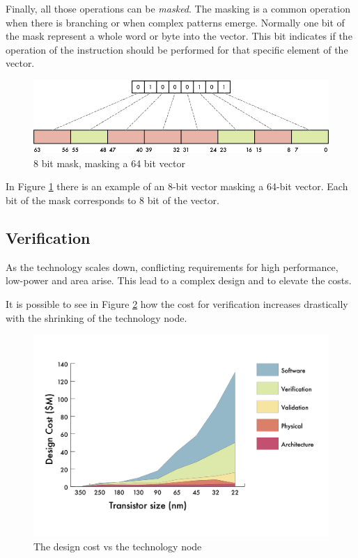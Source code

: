Finally, all those operations can be \textit{masked}. The masking is a common operation when there is branching or when complex patterns emerge.
Normally one bit of the mask represent a whole word or byte into the vector. This bit indicates if the operation of the instruction should be performed for that specific element of the vector.


\begin{figure}[H]
    \centering
    \includegraphics[scale = 0.9]{Chapter_1/img/masking.png}
    \caption{8 bit mask, masking a 64 bit vector}
    \label{masking}
\end{figure}

In Figure \ref{masking} there is an example of an 8-bit vector masking a 64-bit vector. Each bit of the mask corresponds to 8 bit of the vector.

\subsection{Verification}
As the technology scales down, conflicting requirements for high performance, low-power and area arise. 
This lead to a complex design and to elevate the costs.

It is possible to see in Figure \ref{verification-tecnology} how the cost for verification increases drastically with the shrinking of the technology node.


\begin{figure}[H]
    \centering
    \includegraphics[scale = 0.4]{Chapter_1/img/cost-scale.png}
    \caption{The design cost vs the technology node~\cite{verification-book-2018}}
    \label{verification-tecnology}
\end{figure}

